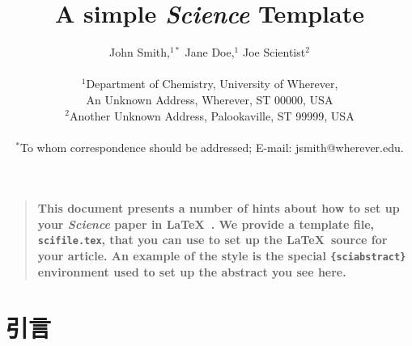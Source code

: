 \documentclass[12pt]{ctexart}
\title{A simple {\it Science\/} Template}
\author
{John Smith,$^{1\ast}$ Jane Doe,$^{1}$ Joe Scientist$^{2}$\\
\\
\normalsize{$^{1}$Department of Chemistry, University of Wherever,}\\
\normalsize{An Unknown Address, Wherever, ST 00000, USA}\\
\normalsize{$^{2}$Another Unknown Address, Palookaville, ST 99999, USA}\\
\\
\normalsize{$^\ast$To whom correspondence should be addressed; E-mail:  jsmith@wherever.edu.}
}
\date{}
\newenvironment{sciabstract}{%
\begin{quote} \bf}
{\end{quote}}
\begin{document}
 


\baselineskip24pt


\maketitle 




\begin{sciabstract}
  This document presents a number of hints about how to set up your
  {\it Science\/} paper in \LaTeX\ .  We provide a template file,
  \texttt{scifile.tex}, that you can use to set up the \LaTeX\ source
  for your article.  An example of the style is the special
  \texttt{\{sciabstract\}} environment used to set up the abstract you
  see here.
\end{sciabstract}




\section*{引言}
\end{document}
